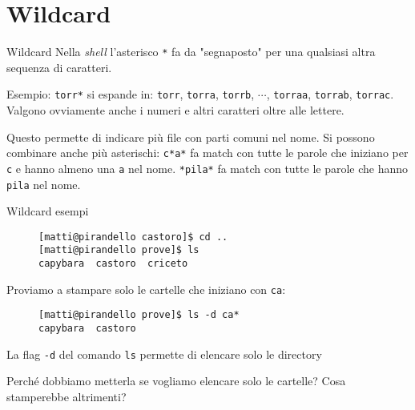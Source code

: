 \section{Wildcard}
\begin{frame}{Wildcard}
  Nella \textit{shell} l'asterisco \texttt{*} fa da "segnaposto" per una 
  qualsiasi altra sequenza di caratteri.\bigskip

  Esempio: \texttt{torr*} si espande in: \texttt{torr}, \texttt{torra}, 
  \texttt{torrb}, $\cdots$, \texttt{torraa}, \texttt{torrab}, \texttt{torrac}. 
  Valgono ovviamente anche i numeri e altri caratteri oltre alle lettere.\bigskip

  Questo permette di indicare più file con parti comuni nel nome. Si possono
  combinare anche più asterischi: \texttt{c*a*} fa match con tutte le
  parole che iniziano per \texttt{c} e hanno almeno una \texttt{a} nel 
  nome. \texttt{*pila*} fa match con tutte le parole che hanno \texttt{pila} nel 
  nome.\bigskip
\end{frame}

\begin{frame}[fragile]{Wildcard esempi}
  \begin{figure}
    \begin{lstlisting}[basicstyle=\footnotesize]
[matti@pirandello castoro]$ cd ..
[matti@pirandello prove]$ ls
capybara  castoro  criceto
    \end{lstlisting}
  \end{figure}

  Proviamo a stampare solo le cartelle che iniziano con \texttt{ca}: 
  
  \begin{figure}
    \begin{lstlisting}[basicstyle=\footnotesize]
[matti@pirandello prove]$ ls -d ca*
capybara  castoro
    \end{lstlisting}
  \end{figure}

  La flag \texttt{-d} del comando \texttt{ls} permette di elencare solo le
  directory \bigskip

  Perché dobbiamo metterla se vogliamo elencare solo le cartelle? Cosa
  stamperebbe altrimenti?

\end{frame}
